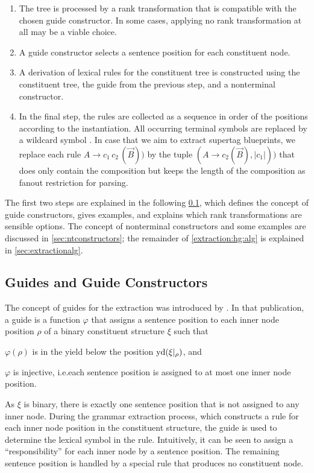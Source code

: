 \documentclass[../../document.tex]{subfiles}
\begin{document}
    \begin{enumerate}
        \item\label{extraction:hg:ranktrans}
            The tree is processed by a rank transformation that is compatible with the chosen guide constructor.
            In some cases, applying no rank transformation at all may be a viable choice.
        \item\label{extraction:hg:guide}
            A guide constructor selects a sentence position for each constituent node.
        \item\label{extraction:hg:alg}
            A derivation of lexical  rules for the constituent tree is constructed using the constituent tree, the guide from the previous step, and a nonterminal constructor.
        \item
            In the final step, the rules are collected as a sequence in order of the positions according to the instantiation.
            All occurring terminal symbols are replaced by a wildcard symbol \tn{*}.
            In case that we aim to extract  supertag blueprints, we replace each  rule \(A \to c_1\,c_2\,(\vec{B}))\) by the tuple \((A \to c_2 (\vec{B}), |c_1|))\) that does only contain the  composition but keeps the length of the  composition as fanout restriction for parsing.
    \end{enumerate}
    The first two steps are explained in the following \cref{sec:guides}, which defines the concept of guide constructors, gives examples, and explains which rank transformations are sensible options.
    The concept of nonterminal constructors and some examples are discussed in \cref{sec:ntconstructors}; the remainder of \cref{extraction:hg:alg} is explained in \cref{sec:extractionalg}.

    \subsection{Guides and Guide Constructors}\label{sec:guides}
    The concept of guides for the extraction was introduced by \citet{Rup22}.
    In that publication, a guide is a function \(\varphi\) that assigns a sentence position to each inner node position \(\rho\) of a binary constituent structure \(\xi\) such that
    \begin{inparaenum}
        \item \(\varphi(\rho)\) is in the yield below the position \(\operatorname{yd}(\xi|_\rho)\), and
        \item \(\varphi\) is injective, i.e.\@ each sentence position is assigned to at most one inner node position.
    \end{inparaenum}
    As \(\xi\) is binary, there is exactly one sentence position that is not assigned to any inner node.
    During the grammar extraction process, which constructs a rule for each inner node position in the constituent structure, the guide is used to determine the lexical symbol in the rule.
    Intuitively, it can be seen to assign a ``responsibility'' for each inner node by a sentence position.
    The remaining sentence position is handled by a special rule that produces no constituent node.
\end{document}
